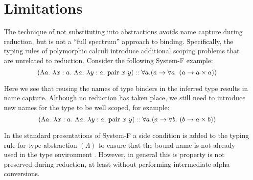 
\section{Limitations}
The technique of not substituting into abstractions avoids name capture during reduction, but is not a ``full spectrum'' approach to binding. Specifically, the typing rules of polymorphic calculi introduce additional scoping problems that are unrelated to reduction. Consider the following System-F example:
$$
(\Lambda a.~ \lambda x : a.~ \Lambda a.~ \lambda y : a.~ \mathrm{pair}~ x~ y)
 :: \forall a. (a \to \forall a.~ (a \to a \times a))
$$

Here we see that reusing the names of type binders in the inferred type results in name capture. Although no reduction has taken place, we still need to introduce new names for the type to be well scoped, for example:
$$
(\Lambda a.~ \lambda x : a.~ \Lambda a.~ \lambda y : a.~ \mathrm{pair}~ x~ y)
 :: \forall a. (a \to \forall b.~ (b \to a \times b))
$$

In the standard presentations of System-F a side condition is added to the typing rule for type abstraction $(\Lambda)$ to ensure that the bound name is not already used in the type environment \cite{Reynolds:type-structure}. However, in general this is property is not preserved during reduction, at least without performing intermediate alpha conversions.
